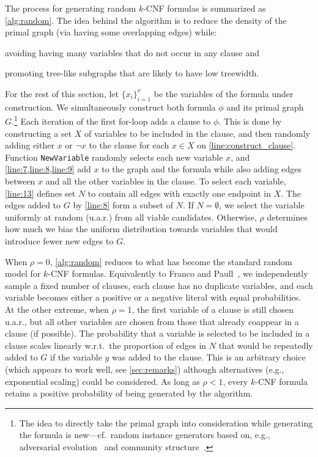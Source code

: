 \documentclass[runningheads]{llncs}
\begin{document}
The process for generating random $k$-CNF formulas is summarized as
\cref{alg:random}. The idea behind the algorithm is to reduce the density of the
primal graph (via having some overlapping edges) while:
\begin{enumerate*}[(a)]
  \item avoiding having many variables that do not occur in any clause and
  \item promoting tree-like subgraphs that are likely to have low treewidth.
\end{enumerate*}
For the rest of this section, let ${\{x_{i}\}}_{i=1}^{\nu}$ be the variables of
the formula under construction. We simultaneously construct both formula $\phi$
and its primal graph $G$.\footnote{The idea to directly take the primal graph
  into consideration while generating the formula is new---cf.\ random \SAT{}
  instance generators based on, e.g., adversarial
  evolution~\cite{DBLP:conf/cec/HossainALA10} and community
  structure~\cite{DBLP:journals/ai/Giraldez-CruL16}.} Each iteration of the
first for-loop adds a clause to $\phi$. This is done by constructing a set $X$
of variables to be included in the clause, and then randomly adding either $x$
or $\neg x$ to the clause for each $x \in X$ on \cref{line:construct_clause}.
Function \texttt{NewVariable} randomly selects each new variable $x$, and
\cref{line:7,line:8,line:9} add $x$ to the graph and the formula while also
adding edges between $x$ and all the other variables in the clause. To select
each variable, \cref{line:13} defines set $N$ to contain all edges with exactly
one endpoint in $X$. The edges added to $G$ by \cref{line:8} form a subset of
$N$. If $N = \emptyset$, we select the variable uniformly at random (u.a.r.)
from all viable candidates. Otherwise, $\rho$ determines how much we bias the
uniform distribution towards variables that would introduce fewer new edges to
$G$.

When $\rho=0$, \cref{alg:random} reduces to what has become the standard random
model for $k$-CNF formulas. Equivalently to
Franco and Paull~\cite{DBLP:journals/dam/FrancoP83},
we independently sample a fixed number of clauses, each clause has no duplicate
variables, and each variable becomes either a positive or a negative literal
with equal probabilities. At the other extreme, when $\rho = 1$, the first
variable of a clause is still chosen u.a.r., but all other variables are chosen
from those that already coappear in a clause (if possible). The probability that
a variable is selected to be included in a clause scales linearly w.r.t.\ the
proportion of edges in $N$ that would be repeatedly added to $G$ if the variable
$y$ was added to the clause. This is an arbitrary choice (which appears to work
well, see \cref{sec:remarks}) although alternatives (e.g., exponential scaling)
could be considered. As long as $\rho < 1$, every $k$-CNF formula retains a
positive probability of being generated by the algorithm.
\end{document}
